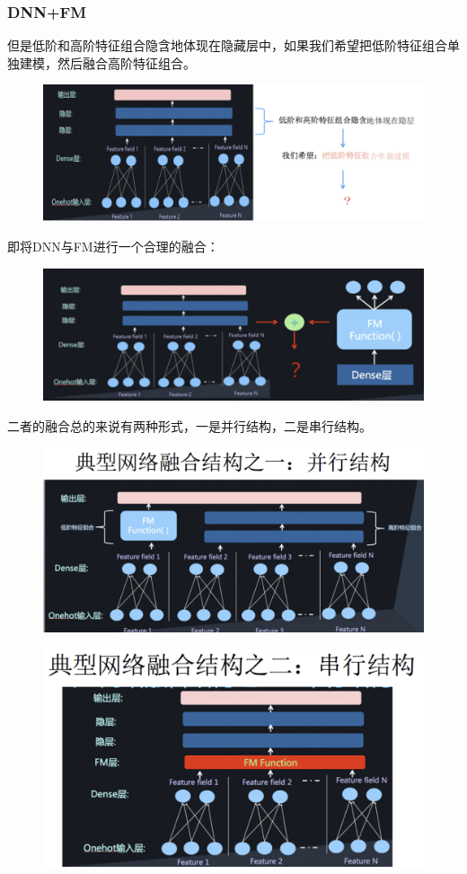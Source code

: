 \documentclass[12pt]{article}
\begin{document}
\subsubsection{DNN+FM}
但是低阶和高阶特征组合隐含地体现在隐藏层中，如果我们希望把低阶特征组合单独建模，然后融合高阶特征组合。
\begin{figure}[H]
    \centering
    \includegraphics[width=.8\textwidth]{fig/Deep_FM_From_One_Hot_To_Dense_Vector_Improve.png}
\end{figure}

即将DNN与FM进行一个合理的融合：
\begin{figure}[H]
    \centering
    \includegraphics[width=.8\textwidth]{fig/Deep_FM_From_One_Hot_To_Dense_Vector_DNN_FM.png}
\end{figure}

二者的融合总的来说有两种形式，一是并行结构，二是串行结构。
\begin{figure}[H]
    \centering
    \includegraphics[width=.8\textwidth]{fig/Deep_FM_From_One_Hot_To_Dense_Vector_Fusion_1.png}
\end{figure}
\begin{figure}[H]
    \centering
    \includegraphics[width=.8\textwidth]{fig/Deep_FM_From_One_Hot_To_Dense_Vector_Fusion_2.png}
\end{figure}
\end{document}
